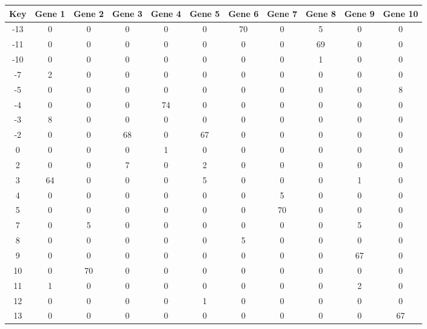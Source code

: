 \begin{tabular}{|c|c|c|c|c|c|c|c|c|c|c|}
\hline
Key & Gene 1 & Gene 2 & Gene 3 & Gene 4 & Gene 5 & Gene 6 & Gene 7 & Gene 8 & Gene 9 & Gene 10 \\
\hline
-13 & 0 & 0 & 0 & 0 & 0 & 70 & 0 & 5 & 0 & 0 \\
-11 & 0 & 0 & 0 & 0 & 0 & 0 & 0 & 69 & 0 & 0 \\
-10 & 0 & 0 & 0 & 0 & 0 & 0 & 0 & 1 & 0 & 0 \\
-7 & 2 & 0 & 0 & 0 & 0 & 0 & 0 & 0 & 0 & 0 \\
-5 & 0 & 0 & 0 & 0 & 0 & 0 & 0 & 0 & 0 & 8 \\
-4 & 0 & 0 & 0 & 74 & 0 & 0 & 0 & 0 & 0 & 0 \\
-3 & 8 & 0 & 0 & 0 & 0 & 0 & 0 & 0 & 0 & 0 \\
-2 & 0 & 0 & 68 & 0 & 67 & 0 & 0 & 0 & 0 & 0 \\
0 & 0 & 0 & 0 & 1 & 0 & 0 & 0 & 0 & 0 & 0 \\
2 & 0 & 0 & 7 & 0 & 2 & 0 & 0 & 0 & 0 & 0 \\
3 & 64 & 0 & 0 & 0 & 5 & 0 & 0 & 0 & 1 & 0 \\
4 & 0 & 0 & 0 & 0 & 0 & 0 & 5 & 0 & 0 & 0 \\
5 & 0 & 0 & 0 & 0 & 0 & 0 & 70 & 0 & 0 & 0 \\
7 & 0 & 5 & 0 & 0 & 0 & 0 & 0 & 0 & 5 & 0 \\
8 & 0 & 0 & 0 & 0 & 0 & 5 & 0 & 0 & 0 & 0 \\
9 & 0 & 0 & 0 & 0 & 0 & 0 & 0 & 0 & 67 & 0 \\
10 & 0 & 70 & 0 & 0 & 0 & 0 & 0 & 0 & 0 & 0 \\
11 & 1 & 0 & 0 & 0 & 0 & 0 & 0 & 0 & 2 & 0 \\
12 & 0 & 0 & 0 & 0 & 1 & 0 & 0 & 0 & 0 & 0 \\
13 & 0 & 0 & 0 & 0 & 0 & 0 & 0 & 0 & 0 & 67 \\
\hline
\end{tabular}